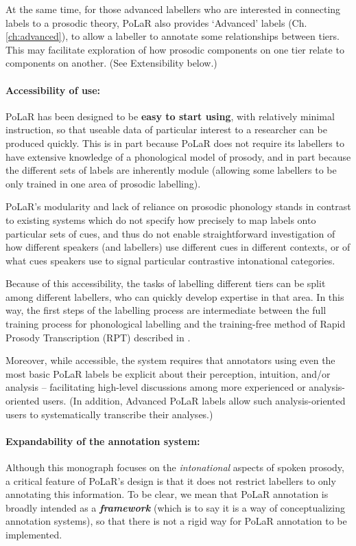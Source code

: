 At the same time, for those advanced labellers who are interested in connecting labels to a prosodic theory, PoLaR also provides ‘Advanced’ labels (Ch.\ref{ch:advanced}), to allow a labeller to annotate some relationships between tiers. This may facilitate exploration of how prosodic components on one tier relate to components on another. (See Extensibility below.)

\paragraph{Accessibility of use:}
PoLaR has been designed to be \textbf{easy to start using}, with relatively minimal instruction, so that useable data of particular interest to a researcher can be produced quickly.  This is in part because PoLaR does not require its labellers to have extensive knowledge of a phonological model of prosody, and in part because the different sets of labels are inherently module (allowing some labellers to be only trained in one area of prosodic labelling).

PoLaR’s modularity and lack of reliance on prosodic phonology stands in contrast to existing systems which do not specify how precisely to map labels onto particular sets of cues, and thus do not enable straightforward investigation of how different speakers (and labellers) use different cues in different contexts, or of what cues speakers use to signal particular contrastive intonational categories.

Because of this accessibility, the tasks of labelling different tiers can be split among different labellers, who can quickly develop expertise in that area.  In this way, the first steps of the labelling process are intermediate between the full training process for phonological labelling and the training-free method of Rapid Prosody Transcription (RPT) described in \citet{cole-14, cole-17}. 

Moreover, while accessible, the system requires that annotators using even the most basic PoLaR labels be explicit about their perception, intuition, and/or analysis – facilitating high-level discussions among more experienced or analysis-oriented users. (In addition, Advanced PoLaR labels allow such analysis-oriented users to systematically transcribe their analyses.)

\paragraph{Expandability of the annotation system:}
Although this monograph focuses on the \emph{intonational} aspects of spoken prosody, a critical feature of PoLaR’s design is that it does not restrict labellers to only annotating this information. To be clear, we mean that PoLaR annotation is broadly intended as a \emph{\textbf{framework}} (which is to say it is a way of conceptualizing annotation systems), so that there is not a rigid way for PoLaR annotation to be implemented. 

